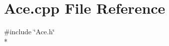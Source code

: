\section{Ace.\+cpp File Reference}
\label{_ace_8cpp}
{\ttfamily \#include \char`\"{}Ace.\+h\char`\"{}}\\*
